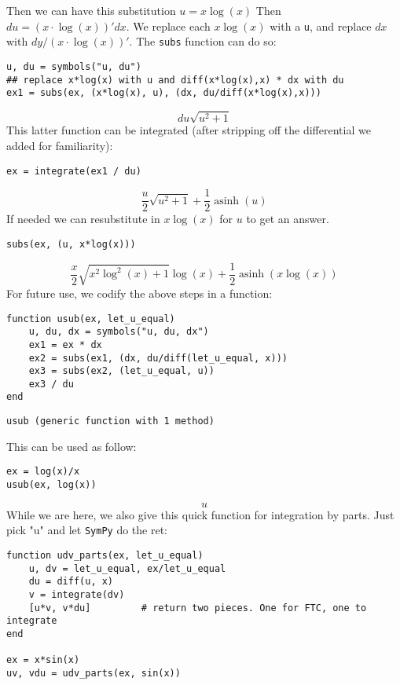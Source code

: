 \documentclass[12pt]{article}
\begin{document}
Then we can have this substitution $u = x\log(x)$  Then $du = (x \cdot \log(x))' dx$.\newline
We replace each $x \log(x)$ with a \texttt{u}, and replace $dx$ with $dy/(x \cdot \log(x))'$. The \texttt{subs} function can do so:\begin{verbatim}
u, du = symbols("u, du")
## replace x*log(x) with u and diff(x*log(x),x) * dx with du
ex1 = subs(ex, (x*log(x), u), (dx, du/diff(x*log(x),x)))
\end{verbatim}
$$du \sqrt{u^{2} + 1}$$\newline
This latter function can be integrated (after stripping off the differential we added for familiarity):\begin{verbatim}
ex = integrate(ex1 / du)
\end{verbatim}
$$\frac{u}{2} \sqrt{u^{2} + 1} + \frac{1}{2} \operatorname{asinh}{\left (u \right )}$$\newline
If needed we can resubstitute in $x \log(x)$ for $u$ to get an answer.\begin{verbatim}
subs(ex, (u, x*log(x)))
\end{verbatim}
$$\frac{x}{2} \sqrt{x^{2} \log^{2}{\left (x \right )} + 1} \log{\left (x \right )} + \frac{1}{2} \operatorname{asinh}{\left (x \log{\left (x \right )} \right )}$$\newline
For future use, we codify the above steps in a function:\begin{verbatim}
function usub(ex, let_u_equal)
    u, du, dx = symbols("u, du, dx")
    ex1 = ex * dx
    ex2 = subs(ex1, (dx, du/diff(let_u_equal, x)))
    ex3 = subs(ex2, (let_u_equal, u))
    ex3 / du
end
\end{verbatim}
\begin{verbatim}
usub (generic function with 1 method)\end{verbatim}
\newline
This can be used as follow:\begin{verbatim}
ex = log(x)/x
usub(ex, log(x))
\end{verbatim}
$$u$$\newline
While we are here, we also give this quick function for integration by parts. Just pick "u" and let \texttt{SymPy} do the ret:\begin{verbatim}
function udv_parts(ex, let_u_equal)
    u, dv = let_u_equal, ex/let_u_equal
    du = diff(u, x)
    v = integrate(dv)
    [u*v, v*du]			# return two pieces. One for FTC, one to integrate
end

ex = x*sin(x)
uv, vdu = udv_parts(ex, sin(x))
\end{verbatim}
\end{document}
